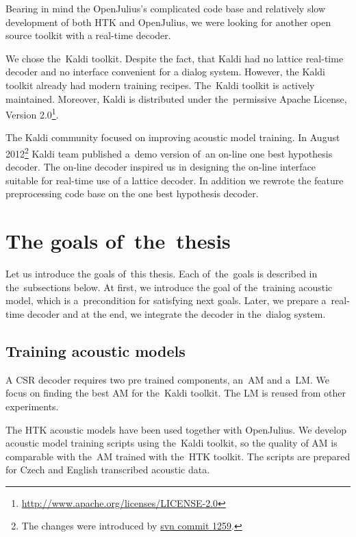 Bearing in mind the OpenJulius's complicated code base and relatively slow
development of both \ac{HTK} and OpenJulius, we were looking 
for another open source toolkit with a real-time decoder.

We chose the~Kaldi toolkit. Despite the fact,  that Kaldi had no lattice real-time decoder
and no interface convenient for a dialog system.
However, the Kaldi toolkit already had modern training recipes.
The~Kaldi toolkit is actively maintained. Moreover, Kaldi is distributed 
under the~permissive Apache License, Version 2.0\footnote{\url{http://www.apache.org/licenses/LICENSE-2.0}}.

The Kaldi community focused on improving acoustic model training. 
In August 2012\footnote{The changes were introduced by \href{https://sourceforge.net/p/kaldi/code/1259/}{svn commit 1259}.}
Kaldi team published a~demo version of~an on-line one best hypothesis decoder.
The on-line decoder inspired us in designing 
the on-line interface suitable for real-time use of a lattice decoder.
In addition we rewrote the feature preprocessing code base on the one best hypothesis decoder.

\section{The goals of~the~thesis} 
\label{sec:goals}
Let us introduce the goals of~this thesis. Each of~the~goals is described in the~subsections below.
At first, we introduce the goal of the~training acoustic model, which is a~precondition for satisfying next goals.
Later, we prepare a~real-time decoder and at the end, we integrate the decoder in the~dialog system. 

\subsection{Training acoustic models} 
\label{sub:training_kaldi_acoustic_models}
A \acl{CSR} decoder requires two pre trained components, an~\acl{AM} and 
a~\acl{LM}. We focus on finding the best \acl{AM} for the~Kaldi toolkit. 
The \acl{LM} is reused from other experiments.

The \ac{HTK} acoustic models have been used together with OpenJulius. 
We develop acoustic model training scripts using the~Kaldi toolkit,
so the quality of \ac{AM} is comparable with the~\ac{AM} trained with the~\ac{HTK} toolkit. 
The scripts are prepared for Czech and English transcribed acoustic data.

 

